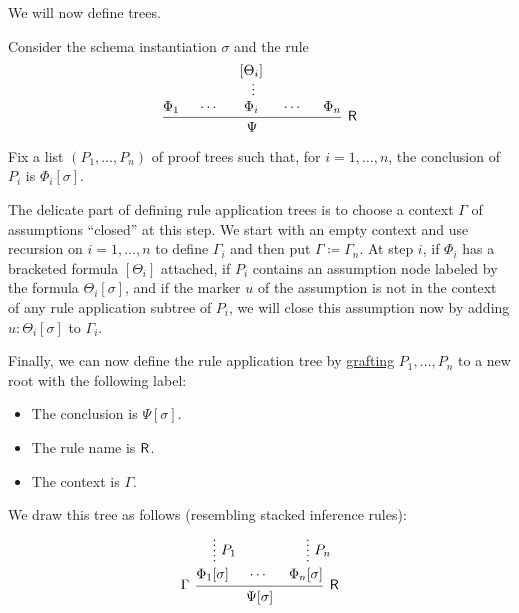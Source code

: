 \begin{definition}
\begin{thmenum}[resume=def:natural_deduction_proof_tree]
     We will now define  trees.

    Consider the schema instantiation \( \sigma \) and the rule
    \begin{equation*}
      \begin{prooftree}
        \hypo{ \Phi_1 }
        \hypo{ \cdots }
        \hypo{ [\Theta_i] }
        \ellipsis {} { \Phi_i }
        \hypo{ \cdots }
        \hypo{ \Phi_n }
        \infer5[\logic{R}]{ \Psi }
      \end{prooftree}
    \end{equation*}

    Fix a list \( (P_1, \ldots, P_n) \) of proof trees such that, for \( i = 1, \ldots, n \), the conclusion of \( P_i \) is \( \Phi_i[\sigma] \).

    The delicate part of defining rule application trees is to choose a context \( \Gamma \) of assumptions \enquote{closed} at this step. We start with an empty context and use recursion on \( i = 1, \ldots, n \) to define \( \Gamma_i \) and then put \( \Gamma \coloneqq \Gamma_n \). At step \( i \), if \( \Phi_i \) has a bracketed formula \( [\Theta_i] \) attached, if \( P_i \) contains an assumption node labeled by the formula \( \Theta_i[\sigma] \), and if the marker \( u \) of the assumption is not in the context of any rule application subtree of \( P_i \), we will close this assumption now by adding \( u: \Theta_i[\sigma] \) to \( \Gamma_i \).

    Finally, we can now define the rule application tree by \hyperref[def:ordered_tree_grafting_product]{grafting} \( P_1, \ldots, P_n \) to a new root with the following label:
    \begin{itemize}
      \item The conclusion is \( \Psi[\sigma] \).
      \item The rule name is \( \textsf{R} \).
      \item The context is \( \Gamma \).
    \end{itemize}

    We draw this tree as follows (resembling stacked inference rules):
    \begin{equation*}
      \begin{prooftree}
        \hypo{}
        \ellipsis { \( P_1 \) } { \Phi_1[\sigma] }

        \hypo{ \cdots }

        \hypo{}
        \ellipsis { \( P_n \) } { \Phi_n[\sigma] }
        \infer[left label=\( \Gamma \)]3[\logic{R}]{ \Psi[\sigma] }
      \end{prooftree}
    \end{equation*}
  \end{thmenum}
\end{definition}
